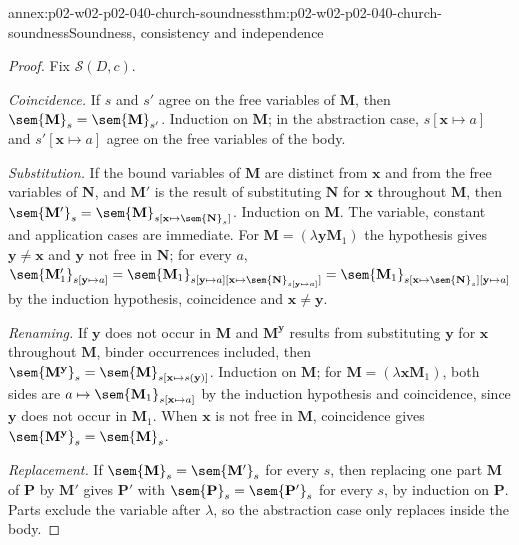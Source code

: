 \begin{annexitem}{annex:p02-w02-p02-040-church-soundness}{thm:p02-w02-p02-040-church-soundness}{Soundness, consistency and independence}
\begin{proof}
Fix \(\mathcal S(D,c)\).

\emph{Coincidence.}  If \(s\) and \(s'\) agree on the free variables of
\(\mathbf M\), then \(\sem{\mathbf M}_s=\sem{\mathbf M}_{s'}\).  Induction on
\(\mathbf M\); in the abstraction case, \(s[\mathbf x\mapsto a]\) and
\(s'[\mathbf x\mapsto a]\) agree on the free variables of the body.

\emph{Substitution.}  If the bound variables of \(\mathbf M\) are distinct
from \(\mathbf x\) and from the free variables of \(\mathbf N\), and
\(\mathbf M'\) is the result of substituting \(\mathbf N\) for
\(\mathbf x\) throughout \(\mathbf M\), then
\(\sem{\mathbf M'}_s=\sem{\mathbf M}_{s[\mathbf x\mapsto\sem{\mathbf N}_s]}\).
Induction on \(\mathbf M\).  The variable, constant and application cases
are immediate.  For \(\mathbf M=(\lambda\mathbf y\mathbf M_1)\) the hypothesis
gives \(\mathbf y\neq\mathbf x\) and \(\mathbf y\) not free in \(\mathbf N\);
for every \(a\),
\(\sem{\mathbf M_1'}_{s[\mathbf y\mapsto a]}
=\sem{\mathbf M_1}_{s[\mathbf y\mapsto a][\mathbf x\mapsto\sem{\mathbf N}_{s[\mathbf y\mapsto a]}]}
=\sem{\mathbf M_1}_{s[\mathbf x\mapsto\sem{\mathbf N}_s][\mathbf y\mapsto a]}\)
by the induction hypothesis, coincidence and \(\mathbf x\neq\mathbf y\).

\emph{Renaming.}  If \(\mathbf y\) does not occur in \(\mathbf M\) and
\(\mathbf M^{\mathbf y}\) results from substituting \(\mathbf y\) for
\(\mathbf x\) throughout \(\mathbf M\), binder occurrences included, then
\(\sem{\mathbf M^{\mathbf y}}_s=\sem{\mathbf M}_{s[\mathbf x\mapsto s(\mathbf y)]}\).
Induction on \(\mathbf M\); for \(\mathbf M=(\lambda\mathbf x\mathbf M_1)\),
both sides are \(a\mapsto\sem{\mathbf M_1}_{s[\mathbf x\mapsto a]}\) by the
induction hypothesis and coincidence, since \(\mathbf y\) does not occur in
\(\mathbf M_1\).  When \(\mathbf x\) is not free in \(\mathbf M\), coincidence
gives \(\sem{\mathbf M^{\mathbf y}}_s=\sem{\mathbf M}_s\).

\emph{Replacement.}  If \(\sem{\mathbf M}_s=\sem{\mathbf M'}_s\) for every
\(s\), then replacing one part \(\mathbf M\) of \(\mathbf P\) by
\(\mathbf M'\) gives \(\mathbf P'\) with \(\sem{\mathbf P}_s=\sem{\mathbf P'}_s\)
for every \(s\), by induction on \(\mathbf P\).  Parts exclude the variable
after \(\lambda\), so the abstraction case only replaces inside the body.


\end{proof}
\end{annexitem}
